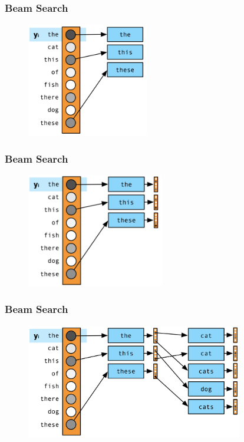 \documentclass[usenames,dvipsnames]{beamer}
\begin{document}
\begin{frame}
\frametitle{Beam Search}
\begin{figure}
  \centering
  \includegraphics[height=5cm, valign=c]{assets/beam2}
\end{figure}
\end{frame}

\begin{frame}
\frametitle{Beam Search}
\begin{figure}
  \centering
  \includegraphics[height=5cm, valign=c]{assets/beam3}
\end{figure}
\end{frame}

\begin{frame}
\frametitle{Beam Search}
\begin{figure}
  \centering
  \includegraphics[height=5cm, valign=c]{assets/beam4}
\end{figure}
\end{frame}
\end{document}
